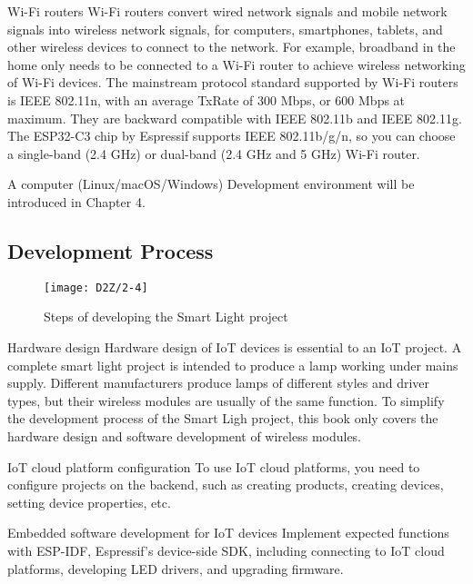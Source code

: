 \documentclass[a4paper,12pt]{book}
\begin{document}
\begin{term}{Wi-Fi routers}
    Wi-Fi routers convert wired network signals and mobile network signals into wireless network signals, for computers, smartphones, tablets, and other wireless devices to connect to the network. For example, broadband in the home only needs to be connected to a Wi-Fi router to achieve wireless networking of Wi-Fi devices. The mainstream protocol standard supported by Wi-Fi routers is IEEE 802.11n, with an average TxRate of 300 Mbps, or 600 Mbps at maximum. They are backward compatible with IEEE 802.11b and IEEE 802.11g. The ESP32-C3 chip by Espressif supports IEEE 802.11b/g/n, so you can choose a single-band (2.4 GHz) or dual-band (2.4 GHz and 5 GHz) Wi-Fi router.
\end{term}

\begin{term}{A computer (Linux/macOS/Windows)}
    Development environment will be introduced in Chapter 4.
\end{term}

\subsection{Development Process}
\begin{figure}[!ht]
        \centering
        \texttt{[image: D2Z/2-4]}
        \caption{Steps of developing the Smart Light project}
\end{figure}

\begin{term}{Hardware design}
    Hardware design of IoT devices is essential to an IoT project. A complete smart light project is intended to produce a lamp working under mains supply. Different manufacturers produce lamps of different styles and driver types, but their wireless modules are usually of the same function. To simplify the development process of the Smart Ligh project, this book only covers the hardware design and software development of wireless modules.
\end{term}

\begin{term}{IoT cloud platform configuration}
    To use IoT cloud platforms, you need to configure projects on the backend, such as creating products, creating devices, setting device properties, etc.
\end{term}

\begin{term}{Embedded software development for IoT devices}
    Implement expected functions with ESP-IDF, Espressif’s device-side SDK, including connecting to IoT cloud platforms, developing LED drivers, and upgrading firmware.
\end{term}
\end{document}
